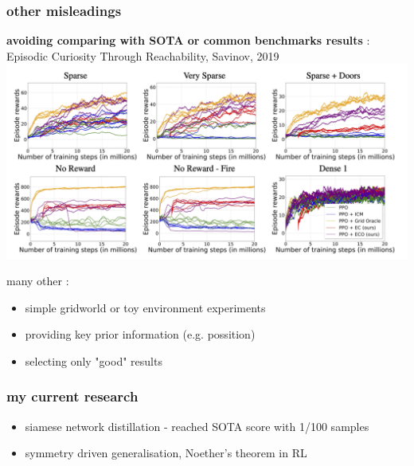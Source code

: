 \documentclass{beamer}
\begin{document}
\begin{frame}
  
  \frametitle{other misleadings}

  \centering
  {\bf avoiding comparing with SOTA or common benchmarks results} :
  Episodic Curiosity Through Reachability, Savinov, 2019 
  \includegraphics[scale=0.25]{../papers_captions/ecr.png}
  \bigskip

  many other :

  \begin{itemize}
    \item simple gridworld or toy environment experiments
    \item providing key prior information (e.g. possition)
    \item selecting only "good" results
  \end{itemize}

\end{frame}




\begin{frame}
  
  \frametitle{my current research}

    \begin{itemize}
      \item siamese network distillation - reached SOTA score with 1/100 samples
      \item symmetry driven generalisation, Noether's theorem in RL
    \end{itemize}

\end{frame}
\end{document}
